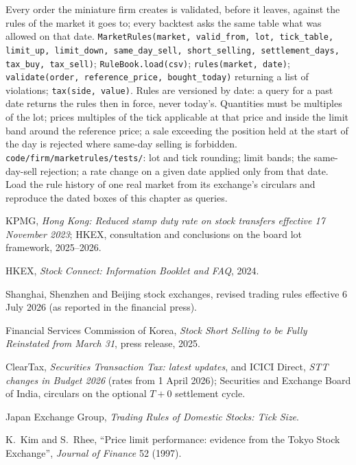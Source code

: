 \begin{build}
 Every order the miniature firm creates is validated, before
it leaves, against the rules of the market it goes to; every backtest asks
the same table what was allowed on that date.
 \texttt{MarketRules(market, valid\_from, lot, tick\_table,
limit\_up, limit\_down, same\_day\_sell, short\_selling, settlement\_days,
tax\_buy, tax\_sell)}; \texttt{RuleBook.load(csv)};
\texttt{rules(market, date)}; \texttt{validate(order, reference\_price,
bought\_today)} returning a list of violations; \texttt{tax(side, value)}.
 Rules are versioned by date: a query for a past date returns
the rules then in force, never today's. Quantities must be multiples of the
lot; prices multiples of the tick applicable at that price and inside the
limit band around the reference price; a sale exceeding the position held at
the start of the day is rejected where same-day selling is forbidden.
 \texttt{code/firm/marketrules/tests/}: lot and tick
rounding; limit bands; the same-day-sell rejection; a rate change on a given
date applied only from that date.
 Load the rule history of one real market from its exchange's
circulars and reproduce the dated boxes of this chapter as queries.
\end{build}

\begin{omsources}
\item KPMG, \emph{Hong Kong: Reduced stamp duty rate on stock transfers
effective 17 November 2023}; HKEX, consultation and conclusions on the board
lot framework, 2025--2026.
\item HKEX, \emph{Stock Connect: Information Booklet and FAQ}, 2024.
\item Shanghai, Shenzhen and Beijing stock exchanges, revised trading rules
effective 6 July 2026 (as reported in the financial press).
\item Financial Services Commission of Korea, \emph{Stock Short Selling to be
Fully Reinstated from March 31}, press release, 2025.
\item ClearTax, \emph{Securities Transaction Tax: latest updates}, and ICICI
Direct, \emph{STT changes in Budget 2026} (rates from 1 April 2026);
Securities and Exchange Board of India, circulars on the optional $T{+}0$
settlement cycle.
\item Japan Exchange Group, \emph{Trading Rules of Domestic Stocks: Tick
Size}.
\item K.~Kim and S.~Rhee, ``Price limit performance: evidence from the Tokyo
Stock Exchange'', \emph{Journal of Finance} 52 (1997).
\end{omsources}

